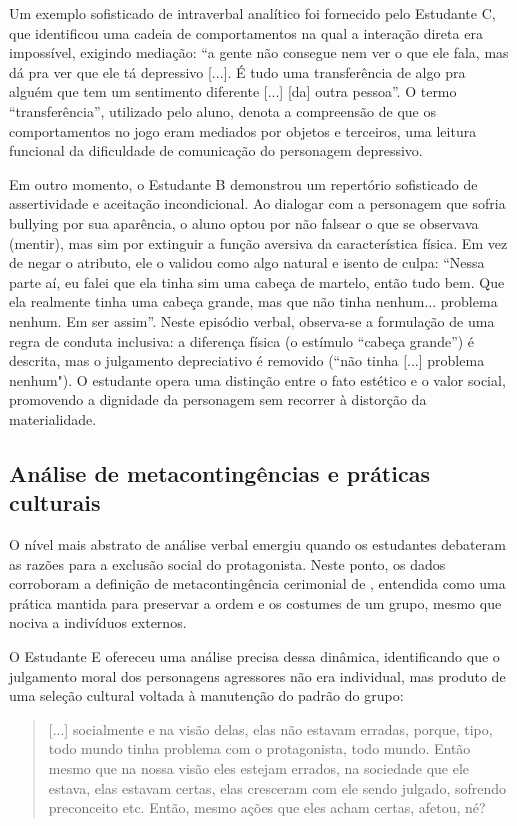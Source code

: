 \documentclass[portuguese]{textolivre}
\begin{document}
Um exemplo sofisticado de intraverbal analítico foi fornecido pelo Estudante C, que identificou uma cadeia de comportamentos na qual a interação direta era impossível, exigindo mediação: “a gente não consegue nem ver o que ele fala, mas dá pra ver que ele tá depressivo [...]. É tudo uma transferência de algo pra alguém que tem um sentimento diferente [...] [da] outra pessoa”. O termo “transferência”, utilizado pelo aluno, denota a compreensão de que os comportamentos no jogo eram mediados por objetos e terceiros, uma leitura funcional da dificuldade de comunicação do personagem depressivo.

Em outro momento, o Estudante B demonstrou um repertório sofisticado de assertividade e aceitação incondicional. Ao dialogar com a personagem que sofria bullying por sua aparência, o aluno optou por não falsear o que se observava (mentir), mas sim por extinguir a função aversiva da característica física. Em vez de negar o atributo, ele o validou como algo natural e isento de culpa: “Nessa parte aí, eu falei que ela tinha sim uma cabeça de martelo, então tudo bem. Que ela realmente tinha uma cabeça grande, mas que não tinha nenhum... problema nenhum. Em ser assim”. Neste episódio verbal, observa-se a formulação de uma regra de conduta inclusiva: a diferença física (o estímulo “cabeça grande”) é descrita, mas o julgamento depreciativo é removido (“não tinha [...] problema nenhum"). O estudante opera uma distinção entre o fato estético e o valor social, promovendo a dignidade da personagem sem recorrer à distorção da materialidade.

\subsection{Análise de metacontingências e práticas culturais}\label{analise}
O nível mais abstrato de análise verbal emergiu quando os estudantes debateram as razões para a exclusão social do protagonista. Neste ponto, os dados corroboram a definição de metacontingência cerimonial de \textcite{todorov2004analise}, entendida como uma prática mantida para preservar a ordem e os costumes de um grupo, mesmo que nociva a indivíduos externos.

O Estudante E ofereceu uma análise precisa dessa dinâmica, identificando que o julgamento moral dos personagens agressores não era individual, mas produto de uma seleção cultural voltada à manutenção do padrão do grupo:

\begin{quote}
    [...] socialmente e na visão delas, elas não estavam erradas, porque, tipo, todo mundo tinha problema com o protagonista, todo mundo. Então mesmo que na nossa visão eles estejam errados, na sociedade que ele estava, elas estavam certas, elas cresceram com ele sendo julgado, sofrendo preconceito etc. Então, mesmo ações que eles acham certas, afetou, né?
\end{quote}
\end{document}
